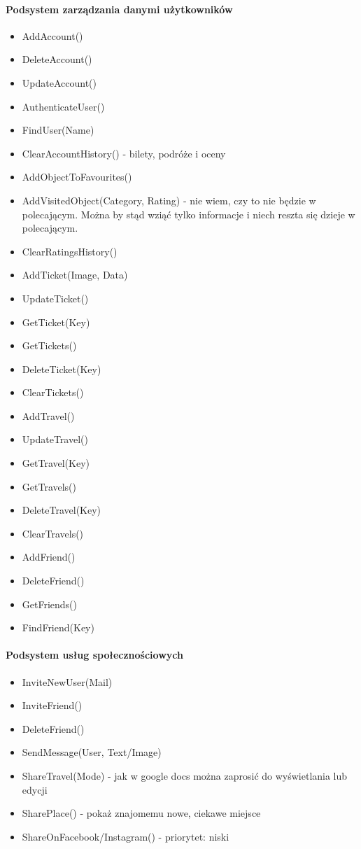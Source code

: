 \documentclass[10pt,twoside,a4paper]{report}
\begin{document}
\paragraph{Podsystem zarządzania danymi użytkowników}
\begin{itemize}
\item AddAccount()
\item DeleteAccount()
\item UpdateAccount()
\item AuthenticateUser()
\item FindUser(Name)
\item ClearAccountHistory() - bilety, podróże i oceny

\item AddObjectToFavourites()
\item AddVisitedObject(Category, Rating) - nie wiem, czy to nie będzie w polecającym.
Można by stąd wziąć tylko informacje i niech reszta się dzieje w polecającym.
\item ClearRatingsHistory()

\item AddTicket(Image, Data)
\item UpdateTicket()
\item GetTicket(Key)
\item GetTickets()
\item DeleteTicket(Key)
\item ClearTickets()

\item AddTravel()
\item UpdateTravel()
\item GetTravel(Key)
\item GetTravels()
\item DeleteTravel(Key)
\item ClearTravels()

\item AddFriend()
\item DeleteFriend()
\item GetFriends()
\item FindFriend(Key)
\end{itemize}

\paragraph{Podsystem usług społecznościowych}
\begin{itemize}
\item InviteNewUser(Mail)
\item InviteFriend()
\item DeleteFriend()
\item SendMessage(User, Text/Image)

\item ShareTravel(Mode) - jak w google docs można zaprosić do wyświetlania lub edycji
\item SharePlace() - pokaż znajomemu nowe, ciekawe miejsce
\item ShareOnFacebook/Instagram() - priorytet: niski
\end{itemize}
\end{document}
